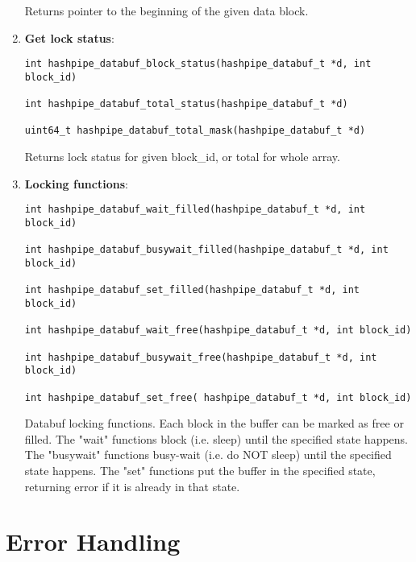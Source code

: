 \documentclass[12pt]{article}
\begin{document}
\begin{enumerate}
Returns pointer to the beginning of the given data block.

\item {\bf Get lock status}:

\begin{lstlisting}
int hashpipe_databuf_block_status(hashpipe_databuf_t *d, int block_id)

int hashpipe_databuf_total_status(hashpipe_databuf_t *d)

uint64_t hashpipe_databuf_total_mask(hashpipe_databuf_t *d)
\end{lstlisting}

Returns lock status for given block\_id, or total for whole array.

\item {\bf Locking functions}:

\begin{lstlisting}
int hashpipe_databuf_wait_filled(hashpipe_databuf_t *d, int block_id)

int hashpipe_databuf_busywait_filled(hashpipe_databuf_t *d, int block_id)

int hashpipe_databuf_set_filled(hashpipe_databuf_t *d, int block_id)

int hashpipe_databuf_wait_free(hashpipe_databuf_t *d, int block_id)

int hashpipe_databuf_busywait_free(hashpipe_databuf_t *d, int block_id)

int hashpipe_databuf_set_free( hashpipe_databuf_t *d, int block_id)
\end{lstlisting}

Databuf locking functions.  Each block in the buffer
can be marked as free or filled.  The "wait" functions
block (i.e. sleep) until the specified state happens.
The "busywait" functions busy-wait (i.e. do NOT sleep)
until the specified state happens.  The "set" functions
put the buffer in the specified state, returning error if
it is already in that state.

\end{enumerate}

\section{Error Handling}
\end{document}
